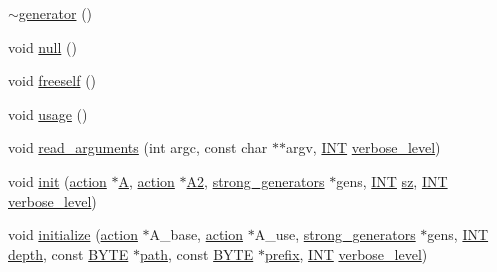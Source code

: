 \begin{DoxyCompactItemize}
\item 
\mbox{\hyperlink{classgenerator_aacffadcf27dfd1cf22bd4f33e1d7a35d}{$\sim$generator}} ()
\item 
void \mbox{\hyperlink{classgenerator_ab6f35c2e1b820b54363f03bb39eb36c5}{null}} ()
\item 
void \mbox{\hyperlink{classgenerator_a9028c09e661b0f3884bd141474519057}{freeself}} ()
\item 
void \mbox{\hyperlink{classgenerator_a5c264330f09efcfe0d364fbccdba9f14}{usage}} ()
\item 
void \mbox{\hyperlink{classgenerator_a4eab346c8d3b5de5bb83578bfb4a15c5}{read\+\_\+arguments}} (int argc, const char $\ast$$\ast$argv, \mbox{\hyperlink{galois_8h_a09fddde158a3a20bd2dcadb609de11dc}{I\+NT}} \mbox{\hyperlink{classgenerator_a7fedc6488314cbc00dbfcc42d311e1ce}{verbose\+\_\+level}})
\item 
void \mbox{\hyperlink{classgenerator_aeca1559b4172cae921620768bd62df47}{init}} (\mbox{\hyperlink{classaction}{action}} $\ast$\mbox{\hyperlink{classgenerator_a6d63c44007eb96239d50c9bc0f21622c}{A}}, \mbox{\hyperlink{classaction}{action}} $\ast$\mbox{\hyperlink{classgenerator_a481f47df2fa87dbb8123e16a230e6f66}{A2}}, \mbox{\hyperlink{classstrong__generators}{strong\+\_\+generators}} $\ast$gens, \mbox{\hyperlink{galois_8h_a09fddde158a3a20bd2dcadb609de11dc}{I\+NT}} \mbox{\hyperlink{classgenerator_ad7f9a92bb686f90239fd2ec3d4cbf42e}{sz}}, \mbox{\hyperlink{galois_8h_a09fddde158a3a20bd2dcadb609de11dc}{I\+NT}} \mbox{\hyperlink{classgenerator_a7fedc6488314cbc00dbfcc42d311e1ce}{verbose\+\_\+level}})
\item 
void \mbox{\hyperlink{classgenerator_af282f1bd802a758d990a7623af42d61c}{initialize}} (\mbox{\hyperlink{classaction}{action}} $\ast$A\+\_\+base, \mbox{\hyperlink{classaction}{action}} $\ast$A\+\_\+use, \mbox{\hyperlink{classstrong__generators}{strong\+\_\+generators}} $\ast$gens, \mbox{\hyperlink{galois_8h_a09fddde158a3a20bd2dcadb609de11dc}{I\+NT}} \mbox{\hyperlink{classgenerator_a2560425547ee25a53b8a184aecc0d23e}{depth}}, const \mbox{\hyperlink{galois_8h_ab6cc7b4aeb6ea31aba2b3fbfc83ff5e6}{B\+Y\+TE}} $\ast$\mbox{\hyperlink{classgenerator_af16790efe4f3dae71a9be4cc46abae8a}{path}}, const \mbox{\hyperlink{galois_8h_ab6cc7b4aeb6ea31aba2b3fbfc83ff5e6}{B\+Y\+TE}} $\ast$\mbox{\hyperlink{classgenerator_a35b7e77dabb2253694dce7114827f958}{prefix}}, \mbox{\hyperlink{galois_8h_a09fddde158a3a20bd2dcadb609de11dc}{I\+NT}} \mbox{\hyperlink{classgenerator_a7fedc6488314cbc00dbfcc42d311e1ce}{verbose\+\_\+level}})
\item 
$$
\end{DoxyCompactItemize}
